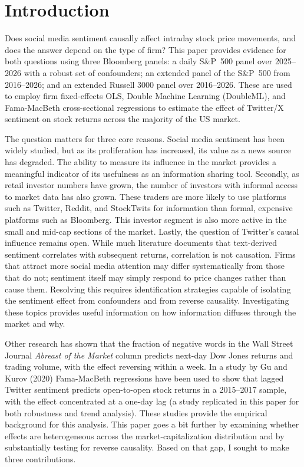 \section{Introduction}\label{introduction}

Does social media sentiment causally affect intraday stock price
movements, and does the answer depend on the type of firm? This paper
provides evidence for both questions using three Bloomberg panels: a
daily S\&P~500 panel over 2025--2026 with a robust set of confounders; an extended panel of the S\&P~500 from 2016--2026; and an extended Russell 3000 panel
over 2016--2026.  These are used to employ firm fixed-effects OLS, Double Machine
Learning (DoubleML), and Fama-MacBeth cross-sectional regressions to
estimate the effect of Twitter/X sentiment on stock returns across the
majority of the US market.

The question matters for three core reasons. Social media sentiment has
been widely studied, but as its proliferation has increased, its value
as a news source has degraded. The ability to measure its influence in
the market provides a meaningful indicator of its usefulness as an
information sharing tool. Secondly, as retail investor numbers have
grown, the number of investors with informal access to market data has
also grown. These traders are more likely to use platforms such as
Twitter, Reddit, and StockTwits for information than formal, expensive
platforms such as Bloomberg. This investor segment is also more active
in the small and mid-cap sections of the market. Lastly, the question of
Twitter's causal influence remains open. While much literature
documents that text-derived sentiment correlates with subsequent
returns, correlation is not causation. Firms that attract more social
media attention may differ systematically from those that do not;
sentiment itself may simply respond to price changes rather than cause
them. Resolving this requires identification strategies capable of
isolating the sentiment effect from confounders and from reverse
causality. Investigating these topics provides useful information on how
information diffuses through the market and why.

Other research has shown that the fraction of negative words in the Wall
Street Journal \emph{Abreast of the Market} column predicts next-day Dow
Jones returns and trading volume, with the effect reversing within a
week. In a study by Gu and Kurov (2020) Fama-MacBeth regressions have
been used to show that lagged Twitter sentiment predicts open-to-open
stock returns in a 2015--2017 sample, with the effect concentrated at a
one-day lag (a study replicated in this paper for both robustness and
trend analysis). These studies provide the empirical background for this
analysis. %
This paper goes a bit further by examining whether effects are
heterogeneous across the market-capitalization distribution and by
substantially testing for reverse causality. Based on that gap, I sought
to make three contributions.

